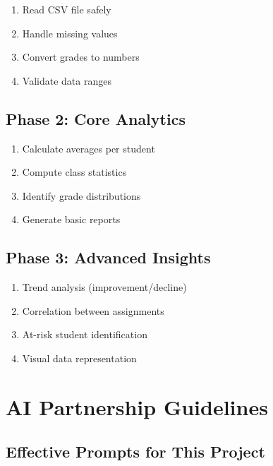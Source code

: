 \documentclass[
  letterpaper,
  DIV=11,
  numbers=noendperiod,
  oneside]{scrreprt}
\providecommand{\tightlist}{%
  \setlength{\itemsep}{0pt}\setlength{\parskip}{0pt}}\usepackage{longtable,booktabs,array}
\begin{document}
\begin{enumerate}
\def\labelenumi{\arabic{enumi}.}
\tightlist
\item
  Read CSV file safely
\item
  Handle missing values
\item
  Convert grades to numbers
\item
  Validate data ranges
\end{enumerate}

\subsection{Phase 2: Core Analytics}\label{phase-2-core-analytics}

\begin{enumerate}
\def\labelenumi{\arabic{enumi}.}
\tightlist
\item
  Calculate averages per student
\item
  Compute class statistics
\item
  Identify grade distributions
\item
  Generate basic reports
\end{enumerate}

\subsection{Phase 3: Advanced Insights}\label{phase-3-advanced-insights}

\begin{enumerate}
\def\labelenumi{\arabic{enumi}.}
\tightlist
\item
  Trend analysis (improvement/decline)
\item
  Correlation between assignments
\item
  At-risk student identification
\item
  Visual data representation
\end{enumerate}

\section{AI Partnership Guidelines}\label{ai-partnership-guidelines-8}

\subsection{Effective Prompts for This
Project}\label{effective-prompts-for-this-project-8}
\end{document}

